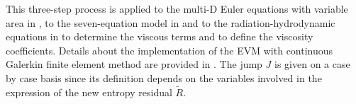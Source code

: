 This three-step process is applied to the multi-D Euler equations with variable area in , to the seven-equation model in  and to the radiation-hydrodynamic equations in  to determine the viscous terms and to define the viscosity coefficients. Details about the implementation of the EVM with continuous Galerkin finite element method are provided in . The jump $J$ is given on a case by case basis since its definition depends on the variables involved in the expression of the new entropy residual $\tilde{R}$.
